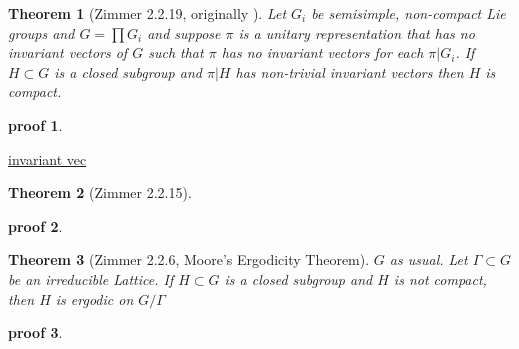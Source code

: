 \documentclass[
  12pt
]{article}
\theoremstyle{break}
\newtheorem{thm}{Theorem}
\theoremstyle{plain}
\newtheorem*{pf}{proof}
\newcommand{\G}{\ensuremath{G}\xspace}
\newcommand{\mpi}{\ensuremath{\pi}\xspace}
\begin{document}
  \begin{thm}[Zimmer 2.2.19, originally \citeauthor{Moore66}\cite{Moore66}]
    \label{thm:2.2.19}
     Let $G_i$ be semisimple, non-compact Lie groups and $G = \prod G_i$ and
     suppose \mpi is a unitary representation that has no invariant vectors of
     \G such that \mpi has no invariant vectors for each $\pi|G_i$. If $H
     \subset G$ is a closed subgroup and $\pi|H$ has non-trivial invariant
     vectors then $H$ is compact.
  \end{thm}

  \begin{pf}
  \end{pf}


  \hyperref[thm:2.2.17]{invariant vec}



  \begin{thm}[Zimmer 2.2.15]
    \label{thm:2.2.15}
     
  \end{thm}

  \begin{pf}
     
  \end{pf}

  \begin{thm}[Zimmer 2.2.6, Moore's Ergodicity Theorem]
    \label{thm:2.2.6}
    \G as usual.
    Let $\Gamma \subset G$ be an irreducible Lattice. %
    If $H \subset G$ is a closed subgroup and $H$ is not compact, then $H$ is ergodic on $G/\Gamma$
  \end{thm}

  \begin{pf}
     
  \end{pf}


\end{document}
